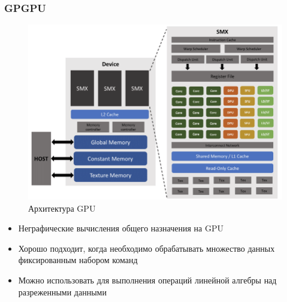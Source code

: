 \documentclass[xcolor=table,english]{beamer}
\begin{document}
\begin{frame}[fragile] \frametitle{GPGPU} 
    \begin{minipage}[m]{0.45\linewidth}
        \begin{figure}
            \centering
            \includegraphics[width=\textwidth]{pictures/gpu_architecture.png}
            \caption{Архитектура GPU}
            \label{fig:architecture}
        \end{figure}
    \end{minipage}\hfill
    \begin{minipage}[m]{0.55\linewidth}
        \begin{itemize}
            \item Неграфические вычисления общего назначения на GPU
            \item Хорошо подходит, когда необходимо обрабатывать множество данных фиксированным набором команд
            \item Можно использовать для выполнения операций линейной алгебры над разреженными данными
        \end{itemize}
    \end{minipage}
\end{frame}
\end{document}
